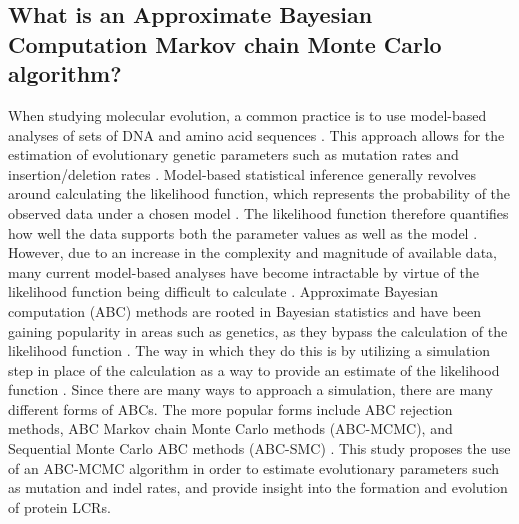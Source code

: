 \documentclass[10pt]{article}
\begin{document}
\subsection{What is an Approximate Bayesian Computation Markov chain Monte Carlo algorithm?}
When studying molecular evolution, a common practice is to use model-based analyses of sets of DNA and amino acid
sequences \citep{laurin2022jump}. This approach allows for the estimation of evolutionary genetic parameters such as
mutation rates and insertion/deletion rates \citep{wu2015estimation}. Model-based statistical inference generally revolves around
calculating the likelihood function, which represents the probability of the observed data under a chosen model \citep{sunnaaker2013approximate}. The likelihood function therefore quantifies how well the data supports both the parameter values as well as the model \citep{sunnaaker2013approximate}. However, due to an increase in the complexity and magnitude of available data, many current model-based analyses have become intractable by virtue of the likelihood function being difficult to calculate \citep{marjoram2013approximation}. Approximate Bayesian computation (ABC) methods are rooted in Bayesian statistics and have been gaining popularity in areas such as genetics, as they bypass the calculation of the likelihood function \citep{sunnaaker2013approximate}. The way in which they do this is by utilizing a simulation step in place of the calculation as a way to provide an estimate of the likelihood function \citep{marjoram2013approximation}. Since there are many ways to approach a simulation, there are many different forms of ABCs. The more popular forms include ABC rejection methods, ABC Markov chain Monte Carlo methods (ABC-MCMC), and Sequential Monte Carlo ABC methods (ABC-SMC) \citep{marjoram2013approximation}. This study proposes the use of an ABC-MCMC algorithm in order to estimate evolutionary parameters such as mutation and indel rates, and provide insight into the formation and evolution of protein LCRs.
\end{document}
